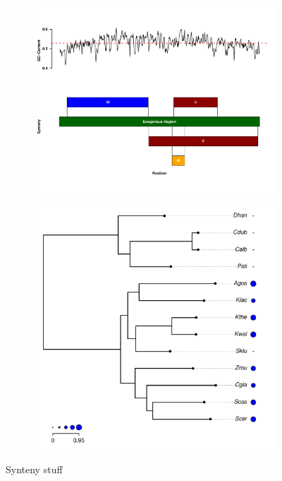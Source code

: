\documentclass[12pt]{article}
\begin{document}
\begin{figure}[H]
    \centering
    \begin{subfigure}
        \centering
        \includegraphics[width=.45\textwidth]{img/synteny_blocks_and_gc.pdf}
    \end{subfigure}
    \begin{subfigure}
        \centering
        \includegraphics[width=.45\textwidth]{img/synteny_coverage.pdf}
    \end{subfigure}
    \caption{Synteny stuff}
    \label{fig:synteny_species}
\end{figure}
\end{document}
